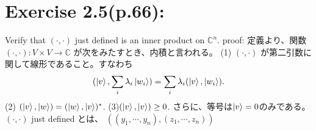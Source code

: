 \section{\Large Exercise 2.5(p.66):}
Verify that $(\cdot, \cdot)$ just defined is an inner product on $\mathbb{C}^n$.
\newline
\vspace{0.1in}
{\large proof:}
 定義より、関数$(\cdot, \cdot):V \times V \to \mathbb{C}$
が次をみたすとき、内積と言われる。
\newline
(1) $(\cdot, \cdot)$ が第二引数に関して線形であること。すなわち
\newline
\begin{eqnarray*}
 (\ket{v}, \sum_{i} \lambda_i \ket{w_i})
 = \sum_{i} \lambda_i (\ket{v}, \ket{w_i}).
\end{eqnarray*}
\newline
(2)
$(\ket{v}, \ket{w}) = (\ket{w}, \ket{v})^*$.
\newline
(3)$(\ket{v}, \ket{v}) \geq 0$.
さらに、等号は$\ket{v} = 0$のみである。
\newline
$(\cdot, \cdot)$ just defined とは、
$((y_1, \cdots, y_n), (z_1, \cdots, z_n)) $ 
